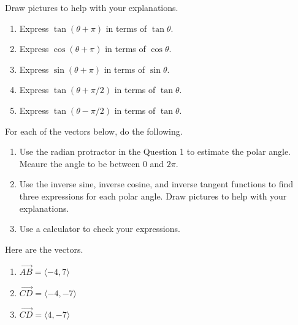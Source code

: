 \documentclass{ximera}
\begin{document}
\begin{question} \label{Q89DfegvVDE}
Draw pictures to help with your explanations.
\begin{enumerate}
\item Express $\tan(\theta+\pi)$ in terms of $\tan \theta$.

\item Express $\cos(\theta+\pi)$ in terms of $\cos \theta$.

\item Express $\sin(\theta+\pi)$ in terms of $\sin \theta$.

\item Express $\tan(\theta+\pi/2)$ in terms of $\tan \theta$.

\item Express $\tan(\theta -\pi/2)$ in terms of $\tan \theta$.
\end{enumerate}
\end{question}



\begin{question}  \label{Q9DDFegbb}
For each of the vectors below, do the following.

\begin{enumerate}
\item Use the radian protractor in the Question 1 to estimate the polar angle. Meaure the angle to be between $0$ and $2\pi$.

\item Use the inverse sine, inverse cosine, and inverse tangent functions to find three expressions for each polar angle. Draw pictures to help with your explanations.

\item Use a calculator to check your expressions.

\end{enumerate}

Here are the vectors.

\begin{enumerate}
\item $\overrightarrow{AB} = \langle -4, 7 \rangle$

\item $\overrightarrow{CD} = \langle -4, -7 \rangle$

\item $\overrightarrow{CD} = \langle 4, -7 \rangle$

\end{enumerate}
\end{question}
\end{document}
